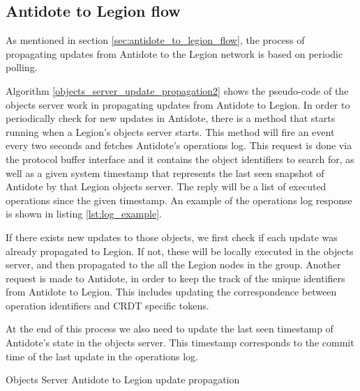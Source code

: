 \subsection{Antidote to Legion flow}
\label{sec:legion_changes_antidote to legion flow}
As mentioned in section \ref{sec:antidote_to_legion_flow}, the process of propagating updates from Antidote to the Legion network is based on periodic polling.\par
	Algorithm \ref{objects_server_update_propagation2} shows the pseudo-code of the objects server work in propagating updates from Antidote to Legion. In order to periodically check for new updates in Antidote, there is a method that starts running when a Legion's objects server starts. This method will fire an event every two seconds and fetches Antidote's operations log. This request is done via the protocol buffer interface and it contains the object identifiers to search for, as well as a given system timestamp that represents the last seen snapshot of Antidote by that Legion objects server. The reply will be a list of executed operations since the given timestamp. An example of the operations log response is shown in listing \ref{lst:log_example}.\par
	If there exists new updates to those objects, we first check if each update was already propagated to Legion. If not, these will be locally executed in the objects server, and then propagated to the all the Legion nodes in the group. Another request is made to Antidote, in order to keep the track of the unique identifiers from Antidote to Legion. This includes updating the correspondence between operation identifiers and CRDT specific tokens.\par
	At the end of this process we also need to update the last seen timestamp of Antidote's state in the objects server. This timestamp corresponds to the commit time of the last update in the operations log.
	
\begin{algorithm}[H]
\caption{Objects Server Antidote to Legion update propagation}\label{objects_server_update_propagation2}
\begin{algorithmic}[1]
          \EndIf
        \EndIf
      \EndFor
\End
\end{algorithmic}
\end{algorithm}
	
